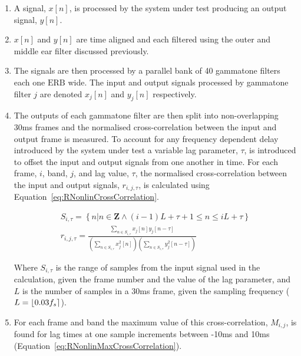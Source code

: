 			\begin{enumerate}
				\item A signal, $x[n]$, is processed by the system under test producing an output signal,
					$y[n]$.

				\item $x[n]$ and $y[n]$ are time aligned and each filtered using the outer and middle ear
					filter discussed previously.

				\item The signals are then processed by a parallel bank of 40 gammatone filters each one
					$\mathrm{ERB}$ wide. The input and output signals processed by gammatone filter $j$
					are denoted $x_j[n]$ and $y_j[n]$ respectively.

				\item The outputs of each gammatone filter are then split into non-overlapping 30ms frames
					and the normalised cross-correlation between the input and output frame is
					measured.  To account for any frequency dependent delay introduced by the system
					under test a variable lag parameter, $\tau$, is introduced to offset the input and
					output signals from one another in time. For each frame, $i$, band, $j$, and lag
					value, $\tau$, the normalised cross-correlation between the input and output
					signals, $r_{i,j,\tau}$, is calculated using
					Equation~\ref{eq:RNonlinCrossCorrelation}.

					\begin{gather}
						S_{i,\tau} = \left\{ n | n \in \textbf{Z} 
							   \land (i-1)L+\tau+1 \leq n \leq iL + \tau \right\} \nonumber \\
						r_{i,j,\tau} = \frac{\sum_{n \in S_{i,\tau}} x_{j}[n]y_{j}[n-\tau]}
							{\left( \sum_{n \in S_{i,\tau}} x_{j}^{2}[n] \right) 
							\left( \sum_{n \in S_{i,\tau}} y_{j}^{2}[n-\tau] \right)}
						\label{eq:RNonlinCrossCorrelation}
					\end{gather}

					Where $S_{i,\tau}$ is the range of samples from the input signal used in the
					calculation, given the frame number and the value of the lag parameter, and $L$ is
					the number of samples in a 30ms frame, given the sampling frequency ($L =
					\left\lfloor0.03f_{s}\right\rceil$). 

				\item For each frame and band the maximum value of this cross-correlation, $M_{i,j}$, is
					found for lag times at one sample increments between -10ms and 10ms
					(Equation~\ref{eq:RNonlinMaxCrossCorrelation}).


\end{enumerate}
